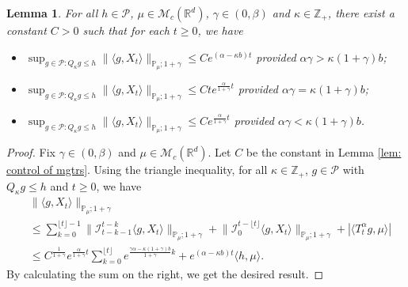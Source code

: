 \documentclass[12pt]{amsart}
\theoremstyle{plain}
\newtheorem{lem}[thm]{Lemma}
\theoremstyle{definition}
\numberwithin{equation}{section}
\begin{document}
\begin{lem}
\label{lem: control moment}
	For all $h \in \mathcal P$, $\mu \in \mathcal M_c(\mathbb{R}^d)$, $\gamma\in (0, \beta)$ and $\kappa \in \mathbb Z_+$, there exist a constant $C > 0$ such that for each $t\geq 0$, we have
\begin{itemize}
\item[(1)]
    $\sup_{g\in \mathcal P: Q_\kappa g \leq h}\|\langle g,X_t\rangle\|_{\mathbb{P}_{\mu};1+\gamma}\leq C e^{(\alpha-\kappa b)t}$ provided $\alpha\gamma > \kappa (1+\gamma)b$;
\item[(2)]
    $\sup_{g\in \mathcal P: Q_\kappa g \leq h}\|\langle g,X_t\rangle\|_{\mathbb{P}_{\mu};1+\gamma}\leq C te^{\frac{\alpha}{1+\gamma}t}$ provided $\alpha\gamma = \kappa (1+\gamma)b$;
\item[(3)]
    $\sup_{g\in \mathcal P: Q_\kappa g \leq h} \|\langle g,X_t\rangle\|_{\mathbb{P}_{\mu};1+\gamma}\leq C e^{\frac{\alpha}{1+\gamma}t}$ provided $\alpha\gamma < \kappa (1+\gamma)b$.
\end{itemize}
\end{lem}
\begin{proof}
    Fix $\gamma \in (0,\beta)$ and $\mu \in \mathcal M_c(\mathbb R^d)$.
    Let $C$ be the constant in Lemma \ref{lem: control of mgtrs}.
    Using the triangle inequality, for all $\kappa\in \mathbb Z_+$, $g \in \mathcal P$ with $Q_\kappa g \leq h$ and $t\geq 0$, we have
\begin{align}
    &\|\langle g,X_t\rangle\|_{\mathbb P_\mu;1+\gamma}
    \\ &\leq \sum_{k=0}^{\lfloor t\rfloor - 1}\big\| \mathcal{I}_{t-k-1}^{t-k}\langle g,X_t\rangle \big\|_{\mathbb P_\mu;1+\gamma}+\big\| \mathcal{I}_{0}^{t-\lfloor t \rfloor}\langle g,X_t\rangle  \big\|_{\mathbb P_\mu;1+\gamma}
    + |\langle T^\alpha_t g,\mu\rangle|
    \\ &\leq C^{\frac{1}{1+\gamma}} e^{\frac{\alpha}{1+\gamma}t} \sum_{k=0}^{\lfloor t\rfloor} e^{\frac{\gamma\alpha-\kappa (1+\gamma)b}{1+\gamma} k} + e^{(\alpha - \kappa b)t} \langle h,\mu\rangle. 
\end{align}
    By calculating the sum on the right, we get the desired result.
\end{proof}
\end{document}
